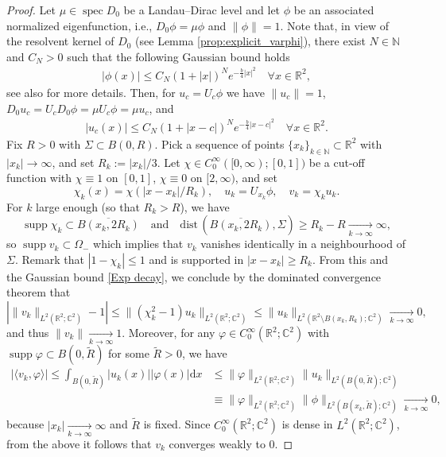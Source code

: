 \documentclass[11pt,a4paper,reqno,oneside]{amsproc}
\DeclareMathOperator{\spec}{spec}
\DeclareMathOperator{\supp}{supp}
\def \rr {{\mathbb R}}
\def \cc {{\mathbb C}}
\def \nn {{\mathbb N}}
\numberwithin{equation}{section}
\def \cc {{\mathbb{C}}}
\begin{document}
\begin{proof}
Let $\mu \in\spec D_0$ be a Landau--Dirac level and let $\phi$ be an associated normalized eigenfunction, i.e., $D_0 \phi=\mu\phi$ and $\| \phi\|=1$. Note that, in view of the resolvent kernel of $D_0$ (see Lemma \ref{prop:explicit_varphi}), there exist $N\in \nn$ and $C_N>0$ such that the following Gaussian bound holds
\begin{align*}
|\phi(x)| \leq C_N(1+|x|)^Ne^{-\frac{b}{4}|x|^2 }\quad \forall x\in\rr^2,
\end{align*}
see also \cite[Sec. 3.1]{RaWa02} for more details.
Then, for $u_c= U_c\phi$ we have $\| u_c\|=1$, $D_0u_c=U_c D_0\phi=\mu U_c\phi=\mu u_c$, and 
\begin{align}\label{Exp decay}
|u_c(x)| \leq C_N(1+|x-c|)^Ne^{-\frac{b}{4}|x-c|^2} \quad \forall x\in\rr^2.
\end{align}
Fix $R>0$ with $\Sigma\subset B(0,R)$. Pick a sequence of points $\{x_k\}_{k\in\nn}\subset \rr^2$ with $|x_k| \rightarrow \infty$, and set $R_k:= |x_k|/3$. Let $\chi\in C_0^\infty([0,\infty);[0,1])$ be a cut-off function with $\chi\equiv 1$ on $[0,1]$, $\chi\equiv 0$ on $[2,\infty)$, and set
\[
\chi_k(x)= \chi(|x-x_k|/R_k),\quad u_k= U_{x_k}\phi, \quad v_k=\chi_k u_k.
\] 
For $k$ large enough (so that $R_k>R$), we have 
\[
\supp \chi_k\subset \overline{B(x_k,2R_k)} \quad\text{and}\quad \mathrm{dist}\,( \overline{B(x_k,2R_k)}, \Sigma)\geq R_k-R  \xrightarrow[k\to\infty]{} \infty,
\]
so  $\supp v_k \subset \Omega_-$ which implies that $v_k$  vanishes identically in a neighbourhood of $\Sigma$. Remark that $|1-\chi_k|\leq 1$ and is supported in $|x-x_k|\geq R_k$. From this and the Gaussian bound \eqref{Exp decay}, we conclude by the dominated convergence theorem that 
\[
| \| v_k\|_{L^2(\rr^2;\cc^2)}-1|\leq  \| (\chi_k^2-1)u_k\|_{L^2(\rr^2;\cc^2)}\leq \|u_k\|_{L^2(\rr^2\setminus B (x_k, R_k);\cc^2)}  \xrightarrow[k\to\infty]{} 0,
\]
and thus $\| v_k\| \xrightarrow[k\to\infty]{} 1$. Moreover, for any $\varphi\in C_0^\infty(\rr^2;\cc^2)$ with $\supp \varphi\subset B(0,\tilde{R})$ for some $\tilde R>0$, we have 
\begin{align*}
|\langle v_k,\varphi\rangle|\leq \int_{ B(0,\tilde{R})} |u_k(x)| |\varphi(x)|\mathrm{d}x &\leq \|\varphi\| _{L^2(\rr^2;\cc^2)} \|u_k\| _{L^2(B(0,\tilde{R});\cc^2)}\\
&\equiv \|\varphi\| _{L^2(\rr^2;\cc^2)} \|\phi\| _{L^2(B(x_k,\tilde{R});\cc^2)} \xrightarrow[k\to\infty]{} 0,
\end{align*}
because $|x_k|  \xrightarrow[k\to\infty]{} \infty$ and $\tilde R$ is fixed. Since $C_0^\infty(\rr^2;\cc^2)$ is dense in $L^2(\rr^2;\cc^2)$, from the above it follows that $v_k$ converges weakly to $0$.


\end{proof}
\end{document}
